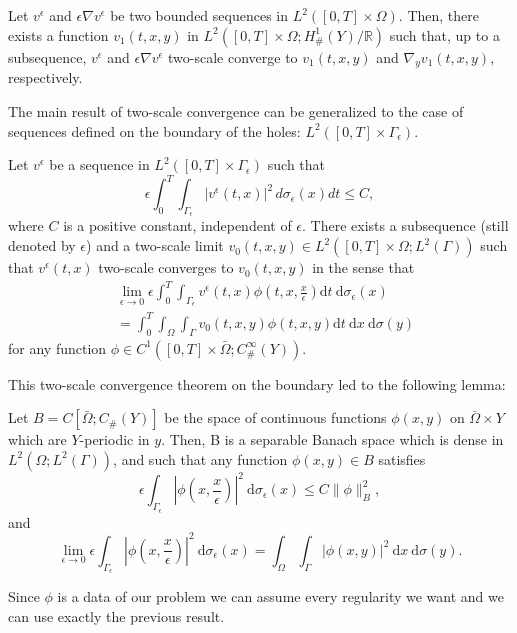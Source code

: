 \begin{theorem} Let $v^{\epsilon}$ and $\epsilon \nabla v^{\epsilon}$ be two bounded sequences in $L^{2}([0, T] \times \Omega)$. Then, there exists a function $v_{1}(t, x, y)$ in $L^{2}\left([0, T] \times \Omega ; H_{\#}^{1}(Y) / \mathbb{R}\right)$ such that, up to a subsequence, $v^{\epsilon}$ and $\epsilon \nabla v^{\epsilon}$ two-scale converge to $v_{1}(t, x, y)$ and $\nabla_{y} v_{1}(t, x, y)$, respectively.
\label{theorem 7.4}\end{theorem}
The main result of two-scale convergence can be generalized to the case of sequences defined on the boundary of the holes: $L^{2}\left([0, T] \times \Gamma_{\epsilon}\right)$.
\begin{theorem}
Let $v^{\epsilon}$ be a sequence in $L^{2}\left([0, T] \times \Gamma_{\epsilon}\right)$ such that
$$
\epsilon \int_{0}^{T} \int_{\Gamma_{\epsilon}}\left|v^{\epsilon}(t, x)\right|^{2} \, d\sigma_{\epsilon}(x)dt \leq C,
$$
where $C$ is a positive constant, independent of $\epsilon$. There exists a subsequence (still denoted by $\epsilon$) and a two-scale limit $v_{0}(t, x, y) \in L^{2}\left([0, T] \times \Omega ; L^{2}(\Gamma)\right)$ such that $v^{\epsilon}(t, x)$ two-scale converges to $v_{0}(t, x, y)$ in the sense that
$$
\begin{aligned}
&\lim _{\epsilon \rightarrow 0} \epsilon \int_{0}^{T} \int_{\Gamma_{\epsilon}} v^{\epsilon}(t, x) \phi\left(t, x, \frac{x}{\epsilon}\right) \mathrm{d} t \mathrm{~d} \sigma_{\epsilon}(x) \\
&=\int_{0}^{T} \int_{\Omega} \int_{\Gamma} v_{0}(t, x, y) \phi(t, x, y) \mathrm{d} t \mathrm{~d} x \mathrm{~d} \sigma(y)
\end{aligned}
$$
for any function $\phi \in C^{1}\left([0, T] \times \bar{\Omega} ; C_{\#}^{\infty}(Y)\right)$.
\label{theorem 7.5}\end{theorem}
This two-scale convergence theorem on the boundary led to the following lemma:
\begin{lemma} Let $B=C\left[\bar{\Omega} ; C_{\#}(Y)\right]$ be the space of continuous functions $\phi(x, y)$ on $\bar{\Omega} \times Y$ which are $Y$-periodic in $y$. Then, B is a separable Banach space which is dense in $L^{2}\left(\Omega ; L^{2}(\Gamma)\right)$, and such that any function $\phi(x, y) \in B$ satisfies
$$
\epsilon \int_{\Gamma_{\epsilon}}\left|\phi\left(x, \frac{x}{\epsilon}\right)\right|^{2} \mathrm{~d} \sigma_{\epsilon}(x) \leq C\|\phi\|_{B}^{2},
$$
and
$$
\lim _{\epsilon \rightarrow 0} \epsilon \int_{\Gamma_{\epsilon}}\left|\phi\left(x, \frac{x}{\epsilon}\right)\right|^{2} \mathrm{~d} \sigma_{\epsilon}(x)=\int_{\Omega} \int_{\Gamma}|\phi(x, y)|^{2} \mathrm{~d} x \mathrm{~d} \sigma(y) .
$$
\label{lemma 7.4}\end{lemma}
Since $\phi$ is a data of our problem we can assume every regularity we want and we can use exactly the previous result.
